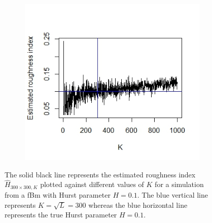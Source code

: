 \documentclass{article}
\begin{document}
\begin{figure}[htbp]
    \centering
    
    \begin{subfigure}{0.78\textwidth}
        \includegraphics[width=\linewidth]{differentK.jpeg}
    \end{subfigure}
    
    \caption{The solid black line represents the estimated roughness index $\hat{H}_{300\times 300,K}$ plotted against different values of $K$ for a simulation from a fBm with Hurst parameter $H=0.1$. The blue vertical line represents $K=\sqrt{L}=300$ whereas the blue horizontal line represents the true Hurst parameter $H=0.1$.}
    \label{fig:checkk}
\end{figure}\\
\end{document}
